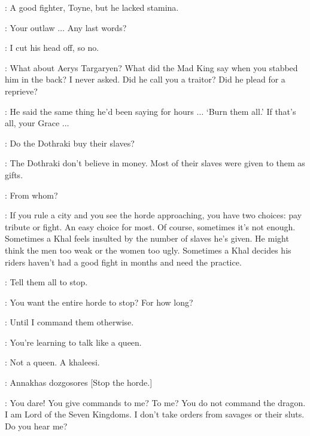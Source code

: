 \SELMY: A good fighter, Toyne, but he lacked stamina. 

\ROBERT: Your outlaw $\ldots$ Any last words? 

\JAIME: I cut his head off, so no. 

\ROBERT: What about Aerys Targaryen? What did the Mad King say when you stabbed him in the back? I never asked. Did he call you a traitor? Did he plead for a reprieve? 

\JAIME: He said the same thing he'd been saying for hours $\ldots$ `Burn them all.' If that's all, your Grace $\ldots$ 


\scene



\DAENERYS: Do the Dothraki buy their slaves? 

\JORAH: The Dothraki don't believe in money. Most of their slaves were given to them as gifts. 

\DAENERYS: From whom? 

\JORAH: If you rule a city and you see the horde approaching, you have two choices: pay tribute or fight. An easy choice for most. Of course, sometimes it's not enough. Sometimes a Khal feels insulted by the number of slaves he's given. He might think the men too weak or the women too ugly. Sometimes a Khal decides his riders haven't had a good fight in months and need the practice. 


\DAENERYS: Tell them all to stop. 

\JORAH: You want the entire horde to stop? For how long? 

\DAENERYS: Until I command them otherwise. 

\JORAH: You're learning to talk like a queen. 

\DAENERYS: Not a queen. A khaleesi. 

\JORAH: Annakhas dozgosores [Stop the horde.]


\VISERYS: You dare! You give commands to me? To me?  You do not command the dragon. I am Lord of the Seven Kingdoms. I don't take orders from savages or their sluts. Do you hear me? 


